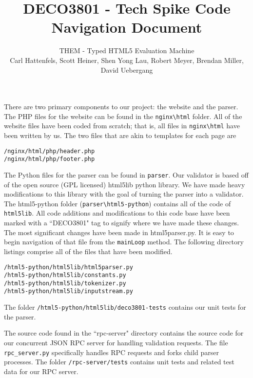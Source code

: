 \documentclass[10pt]{article}
\title{\bf \large DECO3801 - Tech Spike Code Navigation Document}
\author{\normalsize THEM - Typed HTML5 Evaluation Machine \\ \normalsize Carl Hattenfels, Scott Heiner, Shen Yong Lau, Robert Meyer, Brendan Miller, David Uebergang}
\date{}
\begin{document}
\maketitle

There are two primary components to our project: the website and the parser. The PHP files for the website can be found in the \verb'nginx\html' folder. All of the website files have been coded from scratch; that is, all files in \verb'nginx\html' have been written by us. The two files that are akin to templates for each page are 

\begin{verbatim}
/nginx/html/php/header.php
/nginx/html/php/footer.php
\end{verbatim}

The Python files for the parser can be found in \verb'parser'. Our validator is based off of the open source (GPL licensed) html5lib python library. We have made heavy modifications to this library with the goal of turning the parser into a validator. The html5-python folder (\verb'parser\html5-python') contains all of the code of \verb'html5lib'. All code additions and modifications to this code base have been marked with a ``DECO3801" tag to signify where we have made these changes. The most significant changes have been made in html5parser.py. It is easy to begin navigation of that file from the \verb'mainLoop' method. The following directory listings comprise all of the files that have been modified.

\begin{verbatim}/html5-python/html5lib/html5parser.py
/html5-python/html5lib/constants.py
/html5-python/html5lib/tokenizer.py
/html5-python/html5lib/inputstream.py
\end{verbatim}

The folder \verb'/html5-python/html5lib/deco3801-tests' contains our unit tests for the parser.

The source code found in the ``rpc-server" directory contains the source code for our concurrent JSON RPC server for handling validation requests. The file \verb'rpc_server.py' specifically handles RPC requests and forks child parser processes. The folder \verb'/rpc-server/tests' contains unit tests and related test data for our RPC server.
\end{document}
